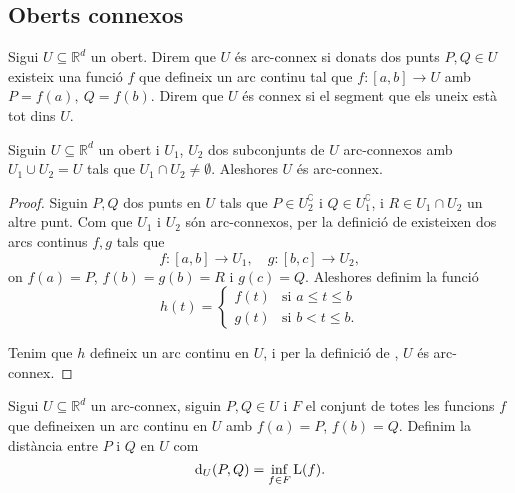 \documentclass[../Apunts.tex]{subfiles}
\begin{document}
	\subsection{Oberts connexos}
	\begin{definition}
		\label{def:Arc-connex}
		\label{def:connex}
		Sigui \(U\subseteq\mathbb{R}^{d}\) un obert. Direm que \(U\) és arc-connex si donats dos punts \(P,Q\in U\) existeix una funció \(f\) que defineix un arc continu tal que \(f\colon[a,b]\longrightarrow U\) amb \(P=f(a),\ Q=f(b)\).
		Direm que \(U\) és connex si el segment que els uneix està tot dins \(U\).
	\end{definition}
	\begin{proposition}
		Siguin \(U\subseteq\mathbb{R}^{d}\) un obert i \(U_{1}\), \(U_{2}\) dos subconjunts de \(U\) arc-connexos amb \(U_{1}\cup U_{2}=U\) tals que \(U_{1}\cap U_{2}\neq\emptyset\). Aleshores \(U\) és arc-connex.
		\begin{proof}
			Siguin \(P,Q\) dos punts en \(U\) tals que \(P\in U_{2}^{\complement}\) i \(Q\in U_{1}^{\complement}\), i \(R\in U_{1}\cap U_{2}\) un altre punt. Com que \(U_{1}\) i \(U_{2}\) són arc-connexos, per la definició de  existeixen dos arcs continus \(f,g\) tals que
			\begin{displaymath}
				f\colon[a,b]\longrightarrow U_{1},\quad
				g\colon[b,c]\longrightarrow U_{2},
			\end{displaymath}
			on \(f(a)=P\), \(f(b)=g(b)=R\) i \(g(c)=Q\).
			Aleshores definim la funció
			\[h(t)=
			\begin{cases}
				f(t) & \text{si }a\leq t\leq b\\
				g(t) & \text{si }b<t\leq b.
			\end{cases}\]
			
			Tenim que \(h\) defineix un arc continu en \(U\), i per la definició de , \(U\) és arc-connex.
		\end{proof}
	\end{proposition}
	\begin{definition}
		\label{def:distància en un arc-connex}
		Sigui \(U\subseteq\mathbb{R}^{d}\) un arc-connex, siguin \(P,Q\in U\) i \(F\) el conjunt de totes les funcions \(f\) que defineixen un arc continu en \(U\) amb \(f(a)=P\), \(f(b)=Q\). Definim la distància entre \(P\) i \(Q\) en \(U\) com
		\begin{displaymath}
		\operatorname{d}_{U}(P,Q)=\inf_{f\in F}\operatorname{L}(f).
		\end{displaymath}
	\end{definition}
\end{document}
